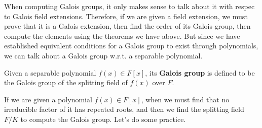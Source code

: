   When computing Galois groups, it only makes sense to talk about it with respec to Galois field extensions. Therefore, if we are given a field extension, we must prove that it is a Galois extension, then find the order of its Galois group, then compute the elements using the theorems we have above. But since we have established equivalent conditions for a Galois group to exist through polynomials, we can talk about a Galois group w.r.t. a separable polynomial. 

  \begin{definition}
    Given a separable polynomial $f(x) \in F[x]$, its \textbf{Galois group} is defined to be the Galois group of the splitting field of $f(x)$ over $F$. 
  \end{definition}

  If we are given a polynomial $f(x) \in F[x]$, when we must find that no irreducible factor of it has repeated roots, and then we find the splitting field $F/K$ to compute the Galois group. Let's do some practice. 

